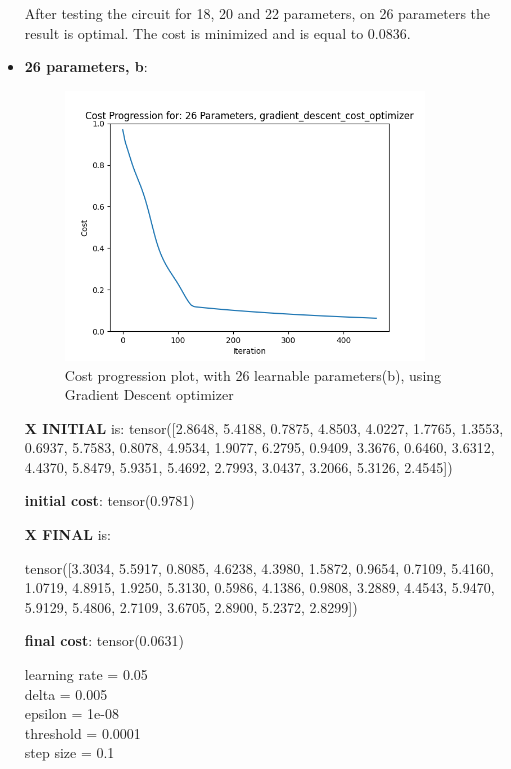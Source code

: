 \documentclass[inscr,ack,preface]{diphdthesis}
\begin{document}
\begin{itemize}
After testing the circuit for 18, 20 and 22 parameters, on 26 parameters the result is optimal. The cost is minimized and is equal to 0.0836.


\item \textbf{26 parameters, b}:

\begin{figure}[ht]
\begin{center}
    \includegraphics[width=0.9\textwidth]{26_b.png}
    \caption{Cost progression plot, with 26 learnable parameters(b), using Gradient Descent optimizer} 
    \label{fig:enter-label}
    \end{center}
\end{figure}

\textbf{X INITIAL} is:
 tensor([2.8648, 5.4188, 0.7875, 4.8503, 4.0227, 1.7765, 1.3553, 0.6937, 5.7583,
        0.8078, 4.9534, 1.9077, 6.2795, 0.9409, 3.3676, 0.6460, 3.6312, 4.4370,
        5.8479, 5.9351, 5.4692, 2.7993, 3.0437, 3.2066, 5.3126, 2.4545])
        
\textbf{initial cost}: tensor(0.9781)

\textbf{X FINAL} is:

tensor([3.3034, 5.5917, 0.8085, 4.6238, 4.3980, 1.5872, 0.9654, 0.7109, 5.4160,
        1.0719, 4.8915, 1.9250, 5.3130, 0.5986, 4.1386, 0.9808, 3.2889, 4.4543,
        5.9470, 5.9129, 5.4806, 2.7109, 3.6705, 2.8900, 5.2372, 2.8299])

\textbf{final cost}: tensor(0.0631)

learning rate =  0.05 \\
delta =  0.005 \\
epsilon =  1e-08 \\
threshold =  0.0001\\ 
step size =  0.1 \\


\end{itemize}
\end{document}

